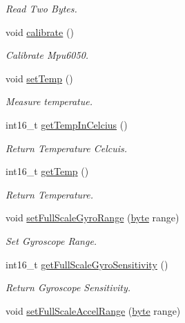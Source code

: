 \begin{DoxyCompactItemize}
\begin{DoxyCompactList}\small\item\em Read Two Bytes. \end{DoxyCompactList}\item 
void \mbox{\hyperlink{class_m_p_u6050_a35657154dd30e206e09ea6407ede106c}{calibrate}} ()
\begin{DoxyCompactList}\small\item\em Calibrate Mpu6050. \end{DoxyCompactList}\item 
void \mbox{\hyperlink{class_m_p_u6050_abbd800900f0d3a98265277e1b8f7127e}{set\+Temp}} ()
\begin{DoxyCompactList}\small\item\em Measure temperatue. \end{DoxyCompactList}\item 
int16\+\_\+t \mbox{\hyperlink{class_m_p_u6050_aedd4952858c54d552041748abf6c68f5}{get\+Temp\+In\+Celcius}} ()
\begin{DoxyCompactList}\small\item\em Return Temperature Celcuis. \end{DoxyCompactList}\item 
int16\+\_\+t \mbox{\hyperlink{class_m_p_u6050_a7d0647ec805da5e48d683bc39d9e5a6c}{get\+Temp}} ()
\begin{DoxyCompactList}\small\item\em Return Temperature. \end{DoxyCompactList}\item 
void \mbox{\hyperlink{class_m_p_u6050_afae60a3ddfba42ead3c29069e3715e11}{set\+Full\+Scale\+Gyro\+Range}} (\mbox{\hyperlink{_m_p_u6050_8hpp_a71809484a26cd96c6abe839a0a8a289d}{byte}} range)
\begin{DoxyCompactList}\small\item\em Set Gyroscope Range. \end{DoxyCompactList}\item 
int16\+\_\+t \mbox{\hyperlink{class_m_p_u6050_af5bb476a5c5960a234ce87ff6cfbc495}{get\+Full\+Scale\+Gyro\+Sensitivity}} ()
\begin{DoxyCompactList}\small\item\em Return Gyroscope Sensitivity. \end{DoxyCompactList}\item 
void \mbox{\hyperlink{class_m_p_u6050_ad97b755c7023408decb2178fd6c0de96}{set\+Full\+Scale\+Accel\+Range}} (\mbox{\hyperlink{_m_p_u6050_8hpp_a71809484a26cd96c6abe839a0a8a289d}{byte}} range)

\end{DoxyCompactItemize}

